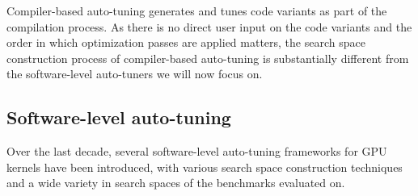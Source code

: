 Compiler-based auto-tuning generates and tunes code variants as part of the compilation process. As there is no direct user input on the code variants and the order in which optimization passes are applied matters, the search space construction process of compiler-based auto-tuning is substantially different from the software-level auto-tuners we will now focus on. 



\subsection{Software-level auto-tuning} \label{subsec:related_work_software_autotuning}
Over the last decade, several software-level auto-tuning frameworks for GPU kernels have been introduced, with various search space construction techniques and a wide variety in search spaces of the benchmarks evaluated on. 

